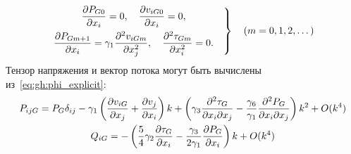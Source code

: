 \begin{equation}\label{eq:gh:stokes}
    \left.\begin{gathered}
        \pder[P_{G0}]{x_i} = 0, \quad \pder[v_{iG0}]{x_i} = 0, \\
        \pder[P_{Gm+1}]{x_i} = \gamma_1\pderdual[v_{iGm}]{x_j}, \quad
        \pderdual[\tau_{Gm}]{x_i} = 0.
    \end{gathered}\quad\right\} \quad (m=0,1,2,\dots)
\end{equation}
Тензор напряжения и вектор потока могут быть вычислены из~\eqref{eq:gh:phi_explicit}:
\begin{gather}
    P_{ijG} = P_G\delta_{ij} - \gamma_1 \left( \pder[v_{iG}]{x_j} + \pder[v_j]{x_i} \right)k
        + \left( \gamma_3\pderder[\tau_G]{x_i}{x_j}
            - \frac{\gamma_6}{\gamma_1}\pderder[P_G]{x_i}{x_j} \right)k^2 + \OO{k^4} \label{eq:gh:stress}\\
    Q_{iG} = - \left( \frac54\gamma_2\pder[\tau_G]{x_i}
        - \frac{\gamma_3}{2\gamma_1}\pder[P_G]{x_i} \right)k + \OO{k^4} \label{eq:gh:heat_flux}
\end{gather}


